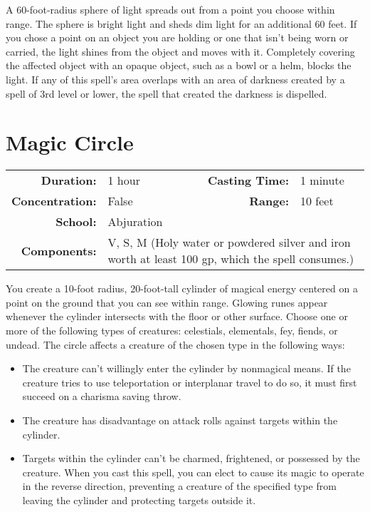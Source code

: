 \documentclass[a5paper, 12pt]{memoir}
\begin{document}
\vspace{1\baselineskip}\noindent A 60-foot-radius sphere of light spreads out from a point you choose within range. The sphere is bright light and sheds dim light for an additional 60 feet. If you chose a point on an object you are holding or one that isn't being worn or carried, the light shines from the object and moves with it. Completely covering the affected object with an opaque object, such as a bowl or a helm, blocks the light. If any of this spell's area overlaps with an area of darkness created by a spell of 3rd level or lower, the spell that created the darkness is dispelled.

\newpage
\section*{Magic Circle}

{
\small\centering\vspace{-6pt}
\begin{tabular}{rlrl}
\toprule

\textbf{Duration:} & 1 hour &
\textbf{Casting Time:} & 1 minute \\
\textbf{Concentration:} & False &
\textbf{Range:} & 10 feet \\
\textbf{School:} & Abjuration \\
\textbf{Components:} & \multicolumn{3}{p{0.7\textwidth}}{V, S, M (Holy water or powdered silver and iron worth at least 100 gp, which the spell consumes.)}\\

\bottomrule
\end{tabular}
}

\vspace{1\baselineskip}\noindent You create a 10-foot radius, 20-foot-tall cylinder of magical energy centered on a point on the ground that you can see within range. Glowing runes appear whenever the cylinder intersects with the floor or other surface. Choose one or more of the following types of creatures: celestials, elementals, fey, fiends, or undead. The circle affects a creature of the chosen type in the following ways:
\begin{itemize}
    \item The creature can't willingly enter the cylinder by nonmagical means. If the creature tries to use teleportation or interplanar travel to do so, it must first succeed on a charisma saving throw.
    \item The creature has disadvantage on attack rolls against targets within the cylinder.
    \item Targets within the cylinder can't be charmed, frightened, or possessed by the creature. When you cast this spell, you can elect to cause its magic to operate in the reverse direction, preventing a creature of the specified type from leaving the cylinder and protecting targets outside it.
\end{itemize}
\end{document}
